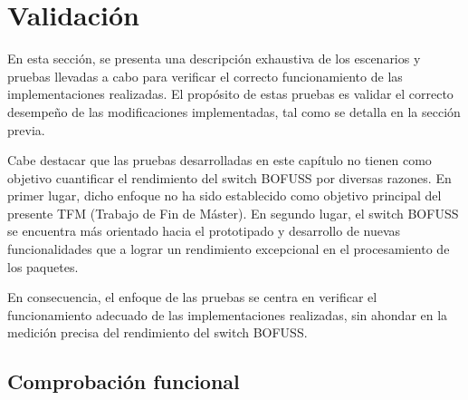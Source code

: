 \section{Validación}
\label{sec:vali}

En esta sección, se presenta una descripción exhaustiva de los escenarios y pruebas llevadas a cabo para verificar el correcto funcionamiento de las implementaciones realizadas. El propósito de estas pruebas es validar el correcto desempeño de las modificaciones implementadas, tal como se detalla en la sección previa.

Cabe destacar que las pruebas desarrolladas en este capítulo no tienen como objetivo cuantificar el rendimiento del switch BOFUSS por diversas razones. En primer lugar, dicho enfoque no ha sido establecido como objetivo principal del presente TFM (Trabajo de Fin de Máster). En segundo lugar, el switch BOFUSS se encuentra más orientado hacia el prototipado y desarrollo de nuevas funcionalidades que a lograr un rendimiento excepcional en el procesamiento de los paquetes.

En consecuencia, el enfoque de las pruebas se centra en verificar el funcionamiento adecuado de las implementaciones realizadas, sin ahondar en la medición precisa del rendimiento del switch BOFUSS.

\subsection{Comprobación funcional}

